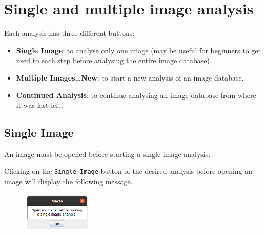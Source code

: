 \documentclass[
  letterpaper,
  DIV=11,
  numbers=noendperiod,
  oneside]{scrreprt}
\providecommand{\tightlist}{%
  \setlength{\itemsep}{0pt}\setlength{\parskip}{0pt}}\usepackage{longtable,booktabs,array}
\begin{document}
\hypertarget{sec-setup}{%
\section{Single and multiple image analysis}\label{sec-setup}}

Each analysis has three different buttons:

\begin{itemize}
\tightlist
\item
  \textbf{Single Image}: to analyse only one image (may be useful for
  beginners to get used to each step before analysing the entire image
  database).
\item
  \textbf{Multiple Images\ldots New}: to start a new analysis of an
  image database.
\item
  \textbf{Continued Analysis}: to continue analysing an image database
  from where it was last left.
\end{itemize}

\hypertarget{single-image}{%
\subsection{Single Image}\label{single-image}}

\begin{tcolorbox}[standard jigsaw,arc=.35mm, toptitle=1mm, titlerule=0mm, bottomtitle=1mm, left=2mm, colbacktitle=quarto-callout-warning-color!10!white, colback=white, opacityback=0, leftrule=.75mm, title=\textcolor{quarto-callout-warning-color}{\faExclamationTriangle}\hspace{0.5em}{Warning}, coltitle=black, rightrule=.15mm, bottomrule=.15mm, toprule=.15mm, opacitybacktitle=0.6, colframe=quarto-callout-warning-color-frame]
An image must be opened before starting a single image analysis.
\end{tcolorbox}

Clicking on the \texttt{Single\ Image} button of the desired analysis
before opening an image will display the following message.

\begin{figure}

{\centering \includegraphics[width=0.3\textwidth,height=\textheight]{./images/screenshots/single_image_error.png}

}

\end{figure}
\end{document}
